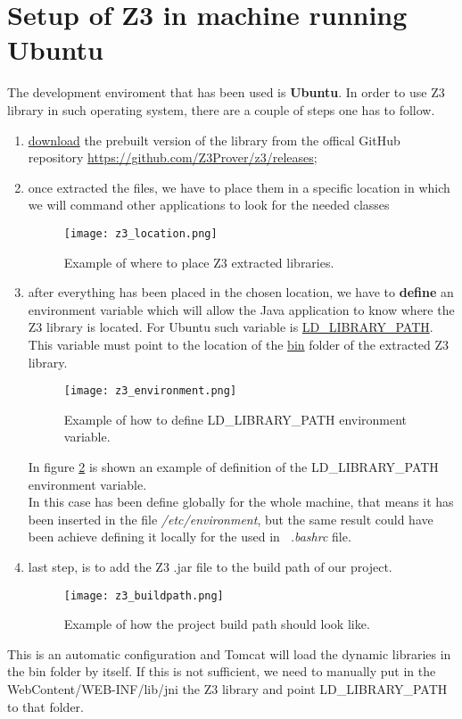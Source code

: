 \section{Setup of Z3 in machine running Ubuntu}
The development enviroment that has been used is \textbf{Ubuntu}. In order to use Z3 library in such operating system, there are a couple of steps one has to follow.
\begin{enumerate}
  \item \underline{download} the prebuilt version of the library from the offical GitHub repository \url{https://github.com/Z3Prover/z3/releases};
  \item once extracted the files, we have to place them in a specific location in which we will command other applications to look for the needed classes
  \begin{figure}[!htb]
     \centering
     \texttt{[image: z3\_location.png]}
     \caption{Example of where to place Z3 extracted libraries.}\label{Fig:Z3Location}
  \end{figure}
  \item after everything has been placed in the chosen location, we have to \textbf{define} an environment variable which will allow the Java application to know where the Z3 library is located. For Ubuntu such variable is \underline{LD\_LIBRARY\_PATH}. This variable must point to the location of the \underline{bin} folder of the extracted Z3 library.
  \begin{figure}[!htb]
     \centering
     \texttt{[image: z3\_environment.png]}
     \caption{Example of how to define LD\_LIBRARY\_PATH environment variable.}\label{Fig:Z3Environment}
  \end{figure}
  In figure \ref{Fig:Z3Environment} is shown an example of definition of the LD\_LIBRARY\_PATH environment variable. \\
  In this case has been define globally for the whole machine, that means it has been inserted in the file \textit{/etc/environment}, but the same result could have been achieve defining it locally for the used in \textit{~.bashrc} file.
  \item last step, is to add the Z3 .jar file to the build path of our project.
  \begin{figure}[!htb]
     \centering
     \texttt{[image: z3\_buildpath.png]}
     \caption{Example of how the project build path should look like.}\label{Fig:Z3BuildPath}
  \end{figure}
\end{enumerate}
This is an automatic configuration and Tomcat will load the dynamic libraries in the bin folder by itself. If this is not sufficient, we need to manually put in the WebContent/WEB-INF/lib/jni the Z3 library and point LD\_LIBRARY\_PATH to that folder.

